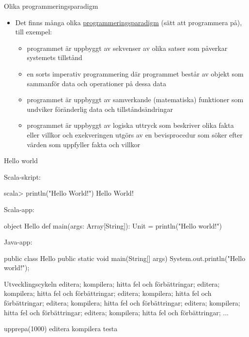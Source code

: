 \begin{Slide}{Olika programmeringsparadigm}
\begin{itemize}
\item Det finns många olika \href{https://en.wikipedia.org/wiki/Programming_paradigm}{programmeringsparadigm} (sätt att programmera på), till exempel:
\begin{itemize}\SlideFontSmall
\item {} programmet är uppbyggt av sekvenser av olika satser som påverkar systemets tillstånd
\item {} en sorts imperativ programmering där programmet består av objekt som sammanför data och operationer på dessa data
\item {} programmet är uppbyggt av samverkande (matematiska) funktioner som undviker föränderlig data och tillståndsändringar
\item {} programmet är uppbyggt av logiska uttryck som beskriver olika fakta eller villkor och exekveringen utgörs av en bevisprocedur som söker efter värden som uppfyller fakta och villkor
\end{itemize}
\end{itemize}
\end{Slide}


\begin{Slide}{Hello world}

Scala-skript:
\begin{REPLnonum}
scala> println("Hello World!")
Hello World!
\end{REPLnonum}

Scala-app:
\begin{Code}
object Hello {
  def main(args: Array[String]): Unit = println("Hello world!")
}
\end{Code}

Java-app:
\begin{Code}[language=Java]
public class Hello {
    public static void main(String[] args) {
        System.out.println("Hello world!");
    }
}
\end{Code}

\end{Slide}

\begin{Slide}{Utvecklingscykeln}
editera; kompilera; hitta fel och förbättringar; editera; kompilera; hitta fel och förbättringar; editera; kompilera; hitta fel och förbättringar; editera; kompilera; hitta fel och förbättringar; editera; kompilera; hitta fel och förbättringar; editera; kompilera; hitta fel och förbättringar; ...

\begin{Code}
upprepa(1000){
  editera
  kompilera
  testa
}
\end{Code}
\end{Slide}

